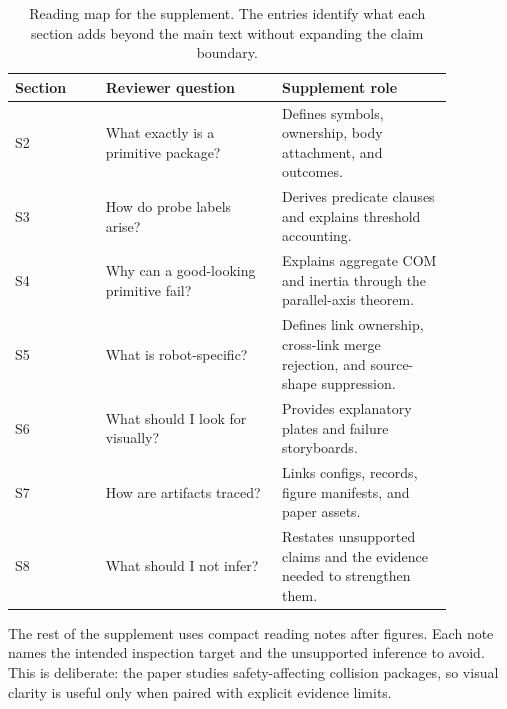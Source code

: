 \begin{table}[t]
\centering
\small
\caption{Reading map for the supplement. The entries identify what each section adds beyond the
main text without expanding the claim boundary.}
\label{tab:supp-reading-map}
\begin{tabular}{p{0.18\linewidth}p{0.35\linewidth}p{0.34\linewidth}}
\toprule
Section & Reviewer question & Supplement role \\
\midrule
S2 & What exactly is a primitive package? & Defines symbols, ownership, body attachment, and outcomes. \\
S3 & How do probe labels arise? & Derives predicate clauses and explains threshold accounting. \\
S4 & Why can a good-looking primitive fail? & Explains aggregate COM and inertia through the parallel-axis theorem. \\
S5 & What is robot-specific? & Defines link ownership, cross-link merge rejection, and source-shape suppression. \\
S6 & What should I look for visually? & Provides explanatory plates and failure storyboards. \\
S7 & How are artifacts traced? & Links configs, records, figure manifests, and paper assets. \\
S8 & What should I not infer? & Restates unsupported claims and the evidence needed to strengthen them. \\
\bottomrule
\end{tabular}
\end{table}

The rest of the supplement uses compact reading notes after figures. Each note names the intended
inspection target and the unsupported inference to avoid. This is deliberate: the paper studies
safety-affecting collision packages, so visual clarity is useful only when paired with explicit
evidence limits.
